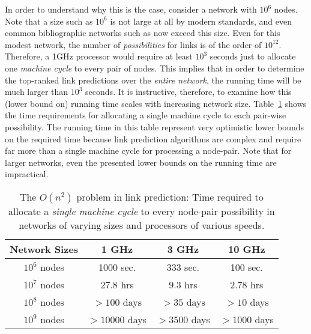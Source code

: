 In order to understand why this is the case,
consider a network with $10^6$ nodes. Note that a size such as
$10^6$ is not large at all by modern standards, and even common
bibliographic networks such as \DBLP now exceed this size. Even
for this modest network, the number of {\em possibilities} for links
is of the order of $10^{12}$. Therefore, a 1GHz processor would
require at least $10^3$ seconds just to allocate one {\em machine cycle} to
every pair of nodes. This implies that in order to determine the
top-ranked link predictions over the {\em entire network}, the
running time will be much larger than $10^3$ seconds.  It is
instructive, therefore, to examine how this (lower bound on) running
time scales with increasing network size. Table~\ref{time} shows the
time requirements for allocating a single machine cycle to each
pair-wise possibility. The running time in this table represent
very optimistic lower bounds on the required time because link
prediction algorithms are complex and require far more than a single
machine cycle for processing a node-pair. Note that for larger
networks, even the presented lower bounds on the running time are
impractical.
\begin{table}
\caption{The $O(n^2)$ problem in link prediction: Time required to
allocate a {\em single machine cycle} to every node-pair possibility
in networks of varying sizes and processors of various speeds.}
\label{time}
\vspace{0ex}
\centering
\begin{tabular}{cccc}
\hline \hline Network Sizes & 1 GHz &  3 GHz & 10 GHz \\
\hline \hline $10^6$ nodes & 1000 sec. & 333 sec. & 100 sec.\\
\hline $10^7$ nodes & 27.8 hrs &  9.3 hrs &  2.78 hrs\\
\hline $10^8$ nodes & $>100$ days &  $>35$ days & $> 10$ days\\
\hline $10^9$ nodes & $>10000$ days & $>3500$ days & $> 1000$ days\\
\hline \hline
\end{tabular}
\vspace{-2ex}
\end{table}





